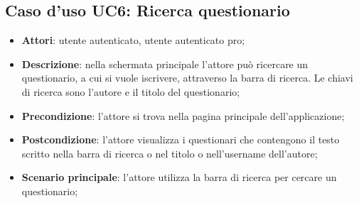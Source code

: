 \newpage
\subsection{Caso d'uso UC6: Ricerca questionario}
\label{UC6}
\begin{itemize}
\item\textbf{Attori}: utente autenticato, utente autenticato pro;
\item\textbf{Descrizione}: nella schermata principale l'attore può ricercare un questionario, a cui si vuole iscrivere, attraverso la barra di ricerca. Le chiavi di ricerca sono l'autore e il titolo del questionario;	
\item\textbf{Precondizione}: l'attore si trova nella pagina principale dell'applicazione;
\item\textbf{Postcondizione}: l'attore visualizza i questionari che contengono il testo scritto nella barra di ricerca o nel titolo o nell'username dell'autore;
\item\textbf{Scenario principale}:
l'attore utilizza la barra di ricerca per cercare un questionario;
\end{itemize}